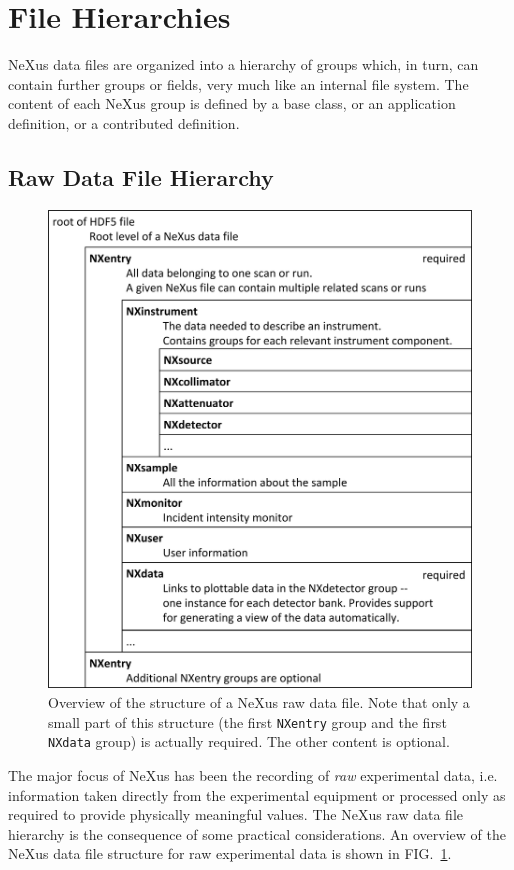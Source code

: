 \documentclass[%
 aip,
rsi,
 amsmath,amssymb,
 reprint,%
]{revtex4-1}
\begin{document}
\section{File Hierarchies}
NeXus data files are organized into a hierarchy of groups which, in turn, can contain further groups or fields, 
very much like an internal file system. The content of each NeXus group is defined by a base class, or 
an application definition, or a contributed definition.


\subsection{Raw Data File Hierarchy}

\begin{figure}
\includegraphics[width=\columnwidth]{figure1}
\caption{\label{rawfile}Overview of the structure of a NeXus raw data file. Note that only a small part of this structure (the first \texttt{NXentry} group and the first \texttt{NXdata} group) is actually required.  The other content is optional.
}
\end{figure}

The major focus of NeXus has been the recording of \emph{raw} experimental data, i.e. information taken directly from the experimental 
equipment or processed only as required to provide physically meaningful values.
The NeXus raw data file hierarchy is the consequence of some practical considerations. 
An overview of the NeXus data file structure for raw experimental data is shown in FIG.~\ref{rawfile}.
\end{document}

